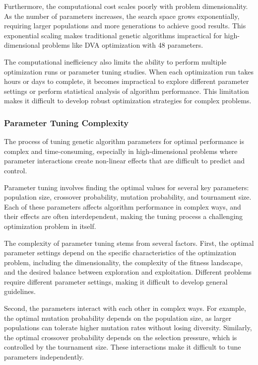 \documentclass[12pt,a4paper]{article}
\begin{document}
Furthermore, the computational cost scales poorly with problem dimensionality. As the number of parameters increases, the search space grows exponentially, requiring larger populations and more generations to achieve good results. This exponential scaling makes traditional genetic algorithms impractical for high-dimensional problems like DVA optimization with 48 parameters.

The computational inefficiency also limits the ability to perform multiple optimization runs or parameter tuning studies. When each optimization run takes hours or days to complete, it becomes impractical to explore different parameter settings or perform statistical analysis of algorithm performance. This limitation makes it difficult to develop robust optimization strategies for complex problems.

\subsubsection{Parameter Tuning Complexity}

The process of tuning genetic algorithm parameters for optimal performance is complex and time-consuming, especially in high-dimensional problems where parameter interactions create non-linear effects that are difficult to predict and control.

Parameter tuning involves finding the optimal values for several key parameters: population size, crossover probability, mutation probability, and tournament size. Each of these parameters affects algorithm performance in complex ways, and their effects are often interdependent, making the tuning process a challenging optimization problem in itself.

The complexity of parameter tuning stems from several factors. First, the optimal parameter settings depend on the specific characteristics of the optimization problem, including the dimensionality, the complexity of the fitness landscape, and the desired balance between exploration and exploitation. Different problems require different parameter settings, making it difficult to develop general guidelines.

Second, the parameters interact with each other in complex ways. For example, the optimal mutation probability depends on the population size, as larger populations can tolerate higher mutation rates without losing diversity. Similarly, the optimal crossover probability depends on the selection pressure, which is controlled by the tournament size. These interactions make it difficult to tune parameters independently.
\end{document}
